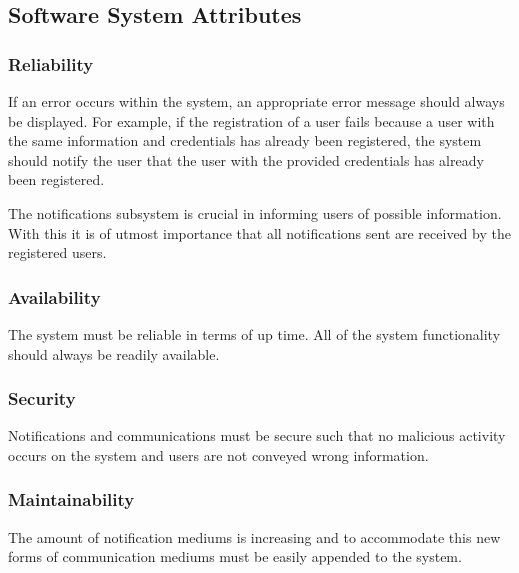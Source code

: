 \documentclass{article}
\begin{document}
\subsection{Software System Attributes}
\subsubsection{Reliability}    
    \begin{flushleft}
    If an error occurs within the system, an appropriate error message should always be displayed. For example, if the registration of a user fails because a user with the same information and credentials has already been registered, the system should notify the user that the user with the provided credentials has already been registered.
\bigskip

    The notifications subsystem is crucial in informing users of possible information. With this it is of utmost importance that all notifications sent are received by the registered users.
    \end{flushleft}
    
    	\subsubsection{Availability}    
    \begin{flushleft}
    The system must be reliable in terms of up time. All of the system functionality should always be readily available.
    \end{flushleft}
    
    	\subsubsection{Security}    
    \begin{flushleft}
    Notifications and communications must be secure such that no malicious activity occurs on the system and users are not conveyed wrong information.
    \end{flushleft}
    
    	\subsubsection{Maintainability}    
    \begin{flushleft}
    The amount of notification mediums is increasing and to accommodate this new forms of communication mediums must be easily appended to the system.
    \end{flushleft}
     \clearpage
     
\end{document}
